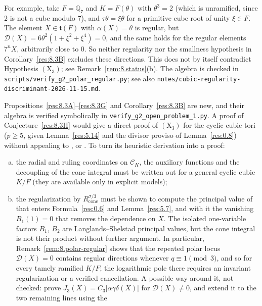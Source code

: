 \documentclass[12pt,letterpaper]{amsart}
\theoremstyle{plain}
\theoremstyle{definition}
\theoremstyle{remark}
\theoremstyle{definition}
\begin{document}
\begin{rem26}
For example, take $F=\mathbb Q_7$ and $K=F(\theta)$ with $\theta^3=2$ (which
is unramified, since $2$ is not a cube modulo $7$), and $\tau\theta=\xi\theta$
for a primitive cube root of unity $\xi\in F$. The element $X\in\mathfrak t(F)$
with $\alpha(X)=\theta$ is regular, but
$\mathscr D(X)=6\theta^2(1+\xi^2+\xi^4)=0$, and the same holds for the regular
elements $7^nX$, arbitrarily close to $0$. So neither regularity nor the
smallness hypothesis in Corollary~\ref{res:8.3B} excludes these directions.
This does not by itself contradict Hypothesis $(\mathrm X_3)$; see
Remark~\ref{rem:8.status}(b). The algebra is checked in
\texttt{scripts/verify\_g2\_polar\_regular.py}; see also
\texttt{notes/cubic-regularity-discriminant-2026-11-15.md}.
\end{rem26}

\begin{rem26}\label{rem:8.status}
Propositions~\ref{res:8.3A}--\ref{res:8.3G} and Corollary~\ref{res:8.3B} are
new, and their algebra is verified symbolically in
\texttt{verify\_g2\_open\_problem\_1.py}. A proof of Conjecture~\ref{res:8.3H}
would give a direct proof of $(\mathrm X_3)$ for the cyclic cubic tori
($p\ge 5$, given Lemma~\ref{res:5.14} and the divisor proviso of
Lemma~\ref{res:0.8}) without appealing to \cite{Wa97}, \cite{Ng10} or
\cite{GH16}. To turn its heuristic derivation into a proof:
\begin{enumerate}[(a)]
\item the radial and ruling coordinates on $\mathcal C_K$, the auxiliary
functions and the decoupling of the cone integral must be written out for a
general cyclic cubic $K/F$ (they are available only in explicit models);
\item the regularization by $R_{\mathrm{cone}}^{\sigma/3}$ must be shown to
compute the principal value of \cite{LS83} that enters
Formula~\ref{res:0.6} and Lemma~\ref{res:5.7}, and with it the vanishing
$B_1(1)=0$ that removes the dependence on $X$. The isolated one-variable
factors $B_1$, $B_2$ are Langlands--Shelstad principal values, but the cone
integral is not their product without further argument. In particular,
Remark~\ref{rem:8.polar-regular} shows that the repeated polar locus
$\mathscr D(X)=0$ contains regular directions whenever $q\equiv1\pmod3$, and so
for every tamely ramified $K/F$; the logarithmic pole there requires an
invariant regularization or a verified cancellation. A possible way around
it, not checked: prove $J_3(X)=C_3|\alpha\gamma\delta(X)|$ for
$\mathscr D(X)\neq0$, and extend it to the two remaining lines using the

\end{enumerate}
\end{rem26}
\end{document}
